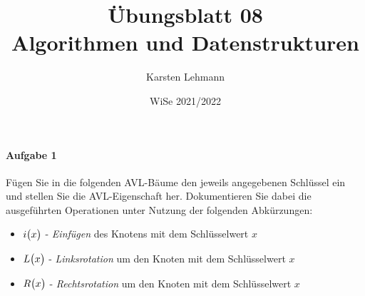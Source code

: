 \documentclass{scrreprt}
\author{Karsten Lehmann}
\date{WiSe 2021/2022}
\title{Übungsblatt 08\\Algorithmen und Datenstrukturen}
\begin{document}
\paragraph{Aufgabe 1}
Fügen Sie in die folgenden AVL-Bäume den jeweils angegebenen Schlüssel ein und
stellen Sie die AVL-Eigenschaft her.
Dokumentieren Sie dabei die ausgeführten Operationen unter Nutzung der folgenden
Abkürzungen:
\begin{itemize}
\item $i\qty\big(x)$ - \emph{Einfügen} des Knotens mit dem Schlüsselwert $x$
\item $L\qty\big(x)$ - \emph{Linksrotation} um den Knoten mit dem Schlüsselwert $x$
\item $R\qty\big(x)$ - \emph{Rechtsrotation} um den Knoten mit dem Schlüsselwert $x$
\end{itemize}
\end{document}

